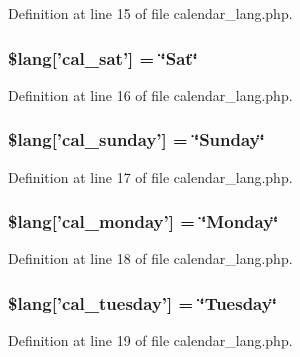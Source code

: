 Definition at line 15 of file calendar\-\_\-lang.\-php.

\subsubsection[{\$lang}]{\setlength{\rightskip}{0pt plus 5cm}\$lang['cal\-\_\-sat'] = \char`\"{}Sat\char`\"{}}\label{calendar__lang_8php_aa1dc0204b4066fa35b0760e1437e8194}


Definition at line 16 of file calendar\-\_\-lang.\-php.

\subsubsection[{\$lang}]{\setlength{\rightskip}{0pt plus 5cm}\$lang['cal\-\_\-sunday'] = \char`\"{}Sunday\char`\"{}}\label{calendar__lang_8php_ade346ced9dfd91f19b1912bda55ed6b9}


Definition at line 17 of file calendar\-\_\-lang.\-php.

\subsubsection[{\$lang}]{\setlength{\rightskip}{0pt plus 5cm}\$lang['cal\-\_\-monday'] = \char`\"{}Monday\char`\"{}}\label{calendar__lang_8php_a55fb324dcfcabd69cc212d116b6b0254}


Definition at line 18 of file calendar\-\_\-lang.\-php.

\subsubsection[{\$lang}]{\setlength{\rightskip}{0pt plus 5cm}\$lang['cal\-\_\-tuesday'] = \char`\"{}Tuesday\char`\"{}}\label{calendar__lang_8php_a2f395fc42eea1e44a77e77525b266061}


Definition at line 19 of file calendar\-\_\-lang.\-php.

